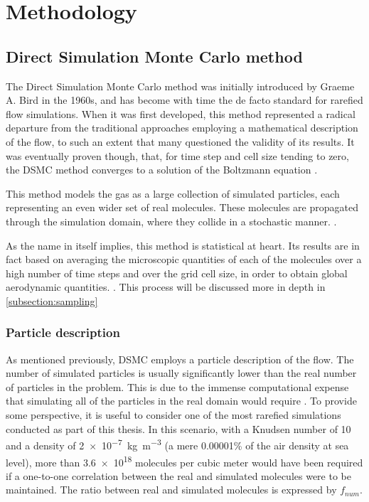 \section{Methodology}
\subsection{Direct Simulation Monte Carlo method}
The Direct Simulation Monte Carlo method  was initially introduced by Graeme A. Bird in the 1960s, and has become with time the de facto standard for rarefied flow simulations. When it was first developed, this method represented a radical departure from the traditional approaches employing a mathematical description of the flow, to such an extent that many questioned the validity of its results. It was eventually proven though, that, for time step and cell size tending to zero, the DSMC method converges to a solution of the Boltzmann equation \cite{bird}.

This method models the gas as a large collection of simulated particles, each representing an even wider set of real molecules. These molecules are propagated through the simulation domain, where they collide in a stochastic manner. \cite{themontecarlo}.

As the name in itself implies, this method is statistical at heart. Its results are in fact based on averaging the microscopic quantities of each of the molecules over a high number of time steps and over the grid cell size, in order to obtain global aerodynamic quantities. \cite{bird, themontecarlo}. This process will be discussed more in depth in \autoref{subsection:sampling}

\subsubsection{Particle description}
As mentioned previously, DSMC employs a particle description of the flow. The number of simulated particles is usually significantly lower than the real number of particles in the problem. This is due to the immense computational expense that simulating all of the particles in the real domain would require \cite{natodsmc}. To provide some perspective, it is useful to consider one of the most rarefied simulations conducted as part of this thesis. In this scenario, with a Knudsen number of 10 and a density of \qty{2e-7}{\kg\per\meter^3} (a mere 0.00001\% of the air density at sea level), more than \qty{3.6e18}{} molecules per cubic meter would have been required if a one-to-one correlation between the real and simulated molecules were to be maintained. The ratio between real and simulated molecules is expressed by $f_{num}$.

